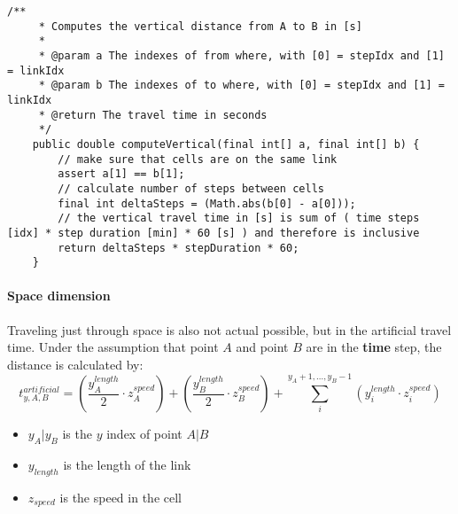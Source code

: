 \begin{lstlisting}[basicstyle=\tiny, style=java, caption={Implementation of \textit{vertical distance calculation}}, label=lst:distance_calc_vertical] 
    /**
     * Computes the vertical distance from A to B in [s]
     *
     * @param a The indexes of from where, with [0] = stepIdx and [1] = linkIdx
     * @param b The indexes of to where, with [0] = stepIdx and [1] = linkIdx
     * @return The travel time in seconds
     */
    public double computeVertical(final int[] a, final int[] b) {
        // make sure that cells are on the same link
        assert a[1] == b[1];
        // calculate number of steps between cells
        final int deltaSteps = (Math.abs(b[0] - a[0]));
        // the vertical travel time in [s] is sum of ( time steps [idx] * step duration [min] * 60 [s] ) and therefore is inclusive
        return deltaSteps * stepDuration * 60;
    }
\end{lstlisting}

\paragraph{Space dimension} Traveling just through space is also not actual possible, but in the artificial travel time. Under the assumption that point $A$ and point $B$ are in the \textbf{time} step, the distance is calculated by:  
\begin{equation}
	t_{y,A,B}^{artificial} = (\frac{y_{A}^{length}}{2}  \cdot z_{A}^{speed}) + (\frac{y_{B}^{length}}{2} \cdot z_{B}^{speed}) + \sum_{i}^{y_A + 1,...,y_B - 1} (y_{i}^{length} \cdot z_{i}^{speed})
\end{equation}
\begin{itemize}
	\setlength\itemsep{0.1em}	
	\item[] $y_A | y_B$ is the $y$ index of point $A | B$
	\item[] $y_{length}$ is the length of the link
	\item[] $z_{speed}$ is the speed in the cell
\end{itemize}

